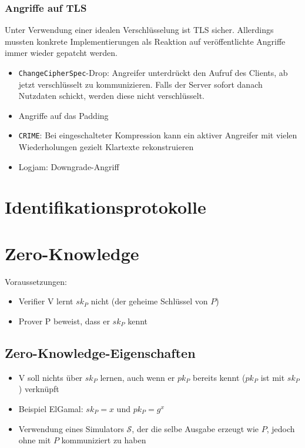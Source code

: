 \FloatBarrier

\subsubsection{Angriffe auf TLS}
Unter Verwendung einer idealen Verschlüsselung ist TLS sicher. Allerdings mussten konkrete Implementierungen als Reaktion auf veröffentlichte Angriffe immer wieder gepatcht werden.

\begin{itemize}
	\item \texttt{ChangeCipherSpec}-Drop: Angreifer unterdrückt den Aufruf des Clients, ab jetzt verschlüsselt zu kommunizieren. Falls der Server sofort danach Nutzdaten schickt, werden diese nicht verschlüsselt.
	\item Angriffe auf das Padding
	\item \texttt{CRIME}: Bei eingeschalteter Kompression kann ein aktiver Angreifer mit vielen Wiederholungen gezielt Klartexte rekonstruieren
	\item Logjam: Downgrade-Angriff
\end{itemize}



\section{Identifikationsprotokolle}



\section{Zero-Knowledge}
Voraussetzungen:
\begin{itemize}
	\item Verifier V lernt \(sk_P\) nicht (der geheime Schlüssel von \(P\))
	\item Prover P beweist, dass er \(sk_P\) kennt
\end{itemize}


\subsection{Zero-Knowledge-Eigenschaften}
\begin{itemize}
	\item V soll nichts über \(sk_P\) lernen, auch wenn er \(pk_P\) bereits kennt (\(pk_P\) ist mit \(sk_P\)) verknüpft
	\item Beispiel ElGamal: \(sk_P = x\) und \(pk_P = g^x\)
	\item Verwendung eines Simulators \(\mathcal{S}\), der die selbe Ausgabe erzeugt wie \(P\), jedoch ohne mit \(P\) kommuniziert zu haben
\end{itemize}

